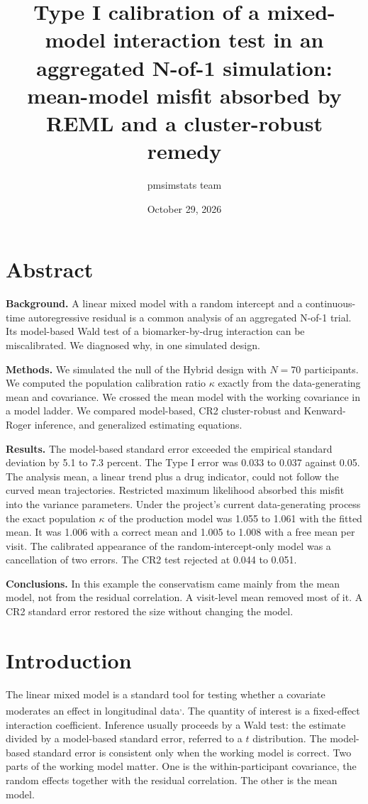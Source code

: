 \documentclass[
  11pt,
]{article}
\title{Type I calibration of a mixed-model interaction test in an aggregated N-of-1 simulation: mean-model misfit absorbed by REML and a cluster-robust remedy}
\author{pmsimstats team}
\date{October 29, 2026}
\begin{document}
\maketitle

{
\setcounter{tocdepth}{2}
\tableofcontents
}
\section*{Abstract}\label{abstract}

\textbf{Background.} A linear mixed model with a random intercept and a
continuous-time autoregressive residual is a common analysis of an
aggregated N-of-1 trial. Its model-based Wald test of a
biomarker-by-drug interaction can be miscalibrated. We diagnosed why,
in one simulated design.

\textbf{Methods.} We simulated the null of the Hybrid design with
\(N = 70\) participants. We computed the population calibration ratio
\(\kappa\) exactly from the data-generating mean and covariance. We
crossed the mean model with the working covariance in a model ladder.
We compared model-based, CR2 cluster-robust and Kenward-Roger
inference, and generalized estimating equations.

\textbf{Results.} The
model-based standard error exceeded the empirical
standard deviation by 5.1 to
7.3 percent. The Type I error was
0.033 to 0.037 against 0.05. The analysis
mean, a linear trend plus a drug indicator, could not follow the
curved mean trajectories. Restricted maximum likelihood absorbed this
misfit into the variance parameters. Under the project's current
data-generating process the exact population \(\kappa\) of the
production model was
1.055 to 1.061 with the fitted mean. It was
1.006 with a correct mean and
1.005 to 1.008 with a free mean per visit. The calibrated
appearance of the random-intercept-only model was a cancellation of
two errors. The
CR2 test rejected at 0.044
to 0.051.

\textbf{Conclusions.} In this example the conservatism came mainly from
the mean model, not from the residual correlation. A visit-level mean
removed most of it. A CR2 standard error restored the size without
changing the model.

\section{Introduction}\label{introduction}

The linear mixed model is a standard tool for testing whether a
covariate moderates an effect in longitudinal data\textsuperscript{,}. The quantity of interest is a fixed-effect
interaction coefficient. Inference usually proceeds by a Wald test:
the estimate divided by a model-based standard error, referred to a
\(t\) distribution. The model-based standard error is consistent only
when the working model is correct. Two parts of the working model
matter. One is the within-participant covariance, the random effects
together with the residual correlation. The other is the mean model.
\end{document}
